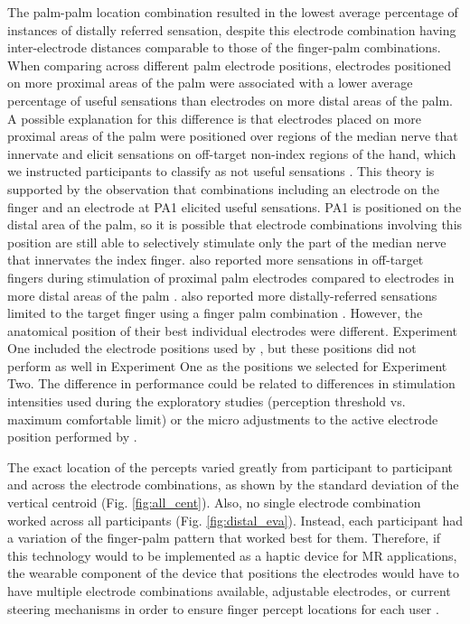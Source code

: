 \documentclass[10pt]{iopart}
\begin{document}
The palm-palm location combination resulted in the lowest average percentage of instances of distally referred sensation, despite this electrode combination having inter-electrode distances comparable to those of the finger-palm combinations. When comparing across different palm electrode positions, electrodes positioned on more proximal areas of the palm were associated with a lower average percentage of useful sensations than electrodes on more distal areas of the palm. A possible explanation for this difference is that electrodes placed on more proximal areas of the palm were positioned over regions of the median nerve that innervate and elicit sensations on off-target non-index regions of the hand, which we instructed participants to classify as not useful sensations \cite{dalonzo_electro-cutaneous_2018, scarpelli_evoking_2020, tanaka_full-hand_2023}. This theory is supported by the observation that combinations including an electrode on the finger and an electrode at PA1 elicited useful sensations. PA1 is positioned on the distal area of the palm, so it is possible that electrode combinations involving this position are still able to selectively stimulate only the part of the median nerve that innervates the index finger. \citeauthor{dalonzo_electro-cutaneous_2018} also reported more sensations in off-target fingers during stimulation of proximal palm electrodes compared to electrodes in more distal areas of the palm \cite{dalonzo_electro-cutaneous_2018}. \cite{tanaka_full-hand_2023} also reported more distally-referred sensations limited to the target finger using a finger palm combination \cite{tanaka_full-hand_2023}. However, the anatomical position of their best individual electrodes were different. Experiment One included the electrode positions used by \citeauthor{tanaka_full-hand_2023}, but these positions did not perform as well in Experiment One as the positions we selected for Experiment Two. The difference in performance could be related to differences in stimulation intensities used during the exploratory studies (perception threshold vs. maximum comfortable limit) or the micro adjustments to the active electrode position performed by \citeauthor{tanaka_full-hand_2023} \cite{tanaka_full-hand_2023}. 

The exact location of the percepts varied greatly from participant to participant and across the electrode combinations, as shown by the standard deviation of the vertical centroid (Fig. \ref{fig:all_cent}). Also, no single electrode combination worked across all participants (Fig. \ref{fig:distal_eva}). Instead, each participant had a variation of the finger-palm pattern that worked best for them. Therefore, if this technology would to be implemented as a haptic device for MR applications, the wearable component of the device that positions the electrodes would have to have multiple electrode combinations available, adjustable electrodes, or current steering mechanisms in order to ensure finger percept locations for each user \cite{tanaka_full-hand_2023}.
\end{document}
